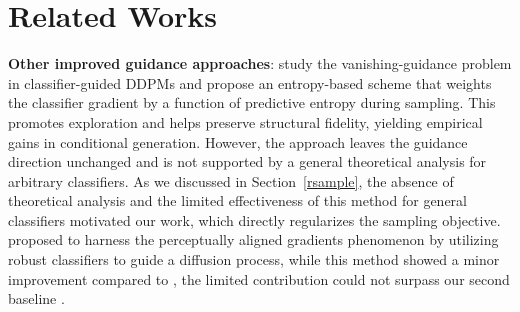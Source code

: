 \documentclass{article}
\begin{document}
\section{Related Works}
\textbf{Other improved guidance approaches}: \cite{zheng2022entropy} study the vanishing-guidance problem in classifier-guided DDPMs and propose an entropy-based scheme that weights the classifier gradient by a function of predictive entropy during sampling. This promotes exploration and helps preserve structural fidelity, yielding empirical gains in conditional generation. However, the approach leaves the guidance direction unchanged and is not supported by a general theoretical analysis for arbitrary classifiers. As we discussed in Section~\ref{rsample}, the absence of theoretical analysis and the limited effectiveness of this method for general classifiers motivated our work, which directly regularizes the sampling objective. \cite{kawar2022enhancing} proposed to harness the perceptually aligned gradients phenomenon by utilizing robust classifiers to guide a diffusion process, while this method showed a minor improvement compared to \cite{dhariwal2021diffusion}, the limited contribution could not surpass our second baseline \cite{ma2023elucidating}. 




 
\end{document}
